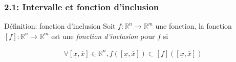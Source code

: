 \documentclass{beamer}
\begin{document}
\begin{frame}
    \frametitle{2.1: Intervalle et fonction d'inclusion}

    \begin{block}{Définition: fonction d'inclusion}
        Soit $f : \mathbb{R}^n \rightarrow \mathbb{R}^m$ une fonction, la fonction $[f] : \mathbb{R}^n \rightarrow \mathbb{R}^m$ est une \textit{fonction d'inclusion} pour $f$ si

        \begin{align}
            \forall[\underline{x}, \overline{x}] \in \mathbb{R}^n , f([\underline{x}, \overline{x}]) \subset [f]([\underline{x}, \overline{x}])
        \end{align}
    \end{block}

\end{frame}
\end{document}
